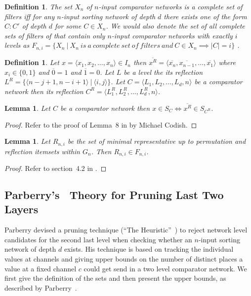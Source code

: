 \documentclass[13pt,a4paper]{article}
\newtheorem{lemma}[theorem]{Lemma}
\newtheorem{definition}[theorem]{Definition}
\begin{document}
\begin{definition}
\label{def:filters}
The set $X_n$ of $n$-input comparator networks is a complete set of filters iff for any $n$-input sorting network of depth $d$ there exists one of the form $C : C'$ of depth $d$ for some $C \in X_n$. We would also denote the set of all complete sets of filters of that contain only $n$-input comparator networks with exactly $i$ levels as $F_{n, i} = \{ X_n ~|~ X_n ~is~a~complete~set~of~filters~and~ C \in X_n \implies |C| = i \}$ .
\end{definition}


\begin{definition}
\label{def:network:reflect}
Let $ x = \langle x_1, x_2, \dots, x_n \rangle \in I_n $ then $ \overline{x^R} = \langle \overline{x_n}, \overline{x_{n-1}}, \dots, \overline{x_1} \rangle $ where $x_i \in \{0, 1\}$ and $\overline{0} = 1$ and $\overline{1} = 0$.
Let $ L $ be a level the its reflection $L^R = \{ \langle n - j + 1, n - i + 1 \rangle  ~|~ \langle i, j \rangle \}$.
Let $ C = \langle L_1, L_2, \dots, L_d, n \rangle $ be a comparator network then its reflection $C^R = \langle L_1^R, L_2^R, \dots, L_d^R, n \rangle $.
\end{definition}

\begin{lemma}
\label{lemma:network:reflect}
Let $ C $ be a comparator network then $x \in S_C \iff \overline{x^R} \in S_{C^R} $.
\end{lemma}

\begin{proof}
Refer to the proof of Lemma~8 in \cite{BundalaCCSZ14_Optimal_Depth} by Michael Codish.
\end{proof}

\begin{lemma}
\label{lemma:reflect}
Let $R_{n, i}$ be the set of minimal representative up to permutation and reflection itemsets within $G_{n}$. Then $R_{n, i} \in F_{n, i}$.
\end{lemma}

\begin{proof}
Refer to section~4.2 in \cite{BundalaCCSZ14_Optimal_Depth}.
\end{proof}

\subsection{Parberry's~\cite{Parberry89} Theory for Pruning Last Two Layers}

Parberry devised a pruning technique (``The Heuristic''~\cite{Parberry89}) to reject network level candidates for the second last level when checking whether an $n$-input sorting network of depth $d$ exists. His technique is based on tracking the individual values at channels and giving upper bounds on the number of distinct places a value at a fixed channel $c$ could get send in a two level comparator network. We first give the definition of the sets and then present the upper bounds, as described by Parberry~\cite{Parberry89}. 
\end{document}
